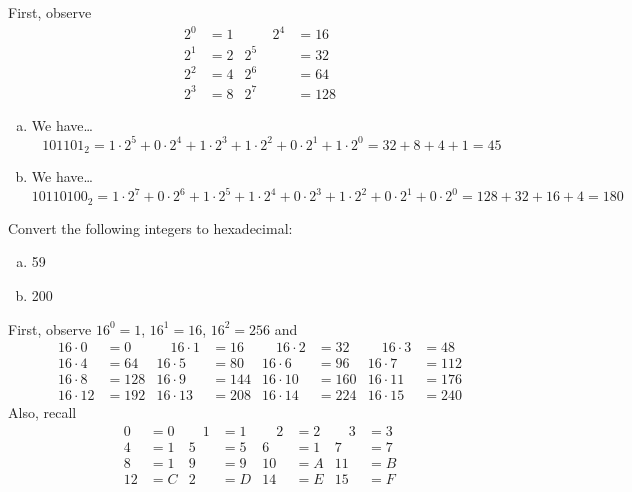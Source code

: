 \documentclass[11pt,letterpaper]{article}
\begin{document}
\sol First, observe
	\[
	\begin{aligned}
	2^0&= 1 &\quad\quad 2^4&= 16 \\
	2^1&= 2 & 2^5&= 32 \\
	2^2&= 4 & 2^6&= 64 \\
	2^3&= 8 & 2^7&= 128
	\end{aligned}
	\]

\begin{enumerate}[(a)]
\item We have\dots
	\[
	101101_2= 1 \cdot 2^5 + 0 \cdot 2^4 + 1 \cdot 2^3 + 1 \cdot 2^2 + 0 \cdot 2^1 + 1 \cdot 2^0= 32 + 8 + 4 + 1= 45
	\]

\item We have\dots
	\[
	10110100_2= 1 \cdot 2^7 + 0 \cdot 2^6 + 1 \cdot 2^5 + 1 \cdot 2^4 + 0 \cdot 2^3 + 1 \cdot 2^2 + 0 \cdot 2^1 + 0 \cdot 2^0= 128 + 32 + 16 + 4= 180
	\]
\end{enumerate}





\newpage





 Convert the following integers to hexadecimal:
        \begin{enumerate}[(a)]
        \item 59
        \item 200
        \end{enumerate}

\sol First, observe $16^0= 1$, $16^1= 16$, $16^2= 256$ and
	\[
	\begin{aligned}
	16 \cdot 0&= 0 &\quad 16 \cdot 1&= 16 &\quad 16 \cdot 2&= 32 &\quad 16 \cdot 3&= 48 \\
	16 \cdot 4&= 64 & 16 \cdot 5&= 80 & 16 \cdot 6&= 96 & 16 \cdot 7&= 112 \\
	16 \cdot 8&= 128 & 16 \cdot 9&= 144 & 16 \cdot 10&= 160 & 16 \cdot 11&= 176 \\
	16 \cdot 12&= 192 & 16 \cdot 13&= 208 & 16 \cdot 14&= 224 & 16 \cdot 15&= 240
	\end{aligned}
	\]
Also, recall
	\[
	\begin{aligned}
	0&= 0 &\quad 1&= 1 &\quad 2&= 2 &\quad 3&= 3 \\
	4&= 1 & 5&= 5 & 6&= 1 & 7&= 7 \\
	8&= 1 & 9&= 9 & 10&= A & 11&= B \\
	12&= C & 2&= D & 14&= E & 15&= F 
	\end{aligned}
	\]
\end{document}
